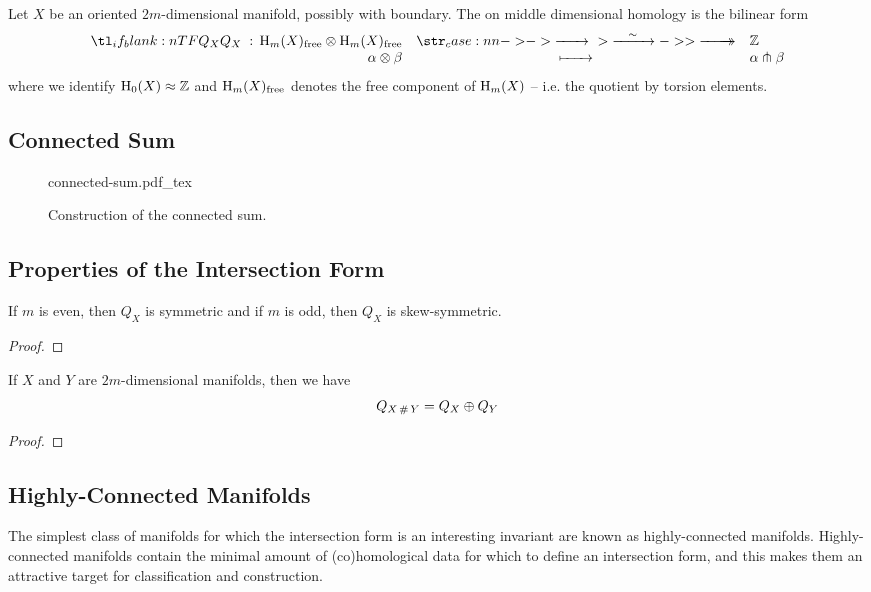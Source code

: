 \begin{definition}
	Let $X$ be an oriented $2m$-dimensional manifold, possibly with boundary. The  on middle dimensional homology is the bilinear form
	\[
		\lkxfunc{Q_X}{\H_m(X)_{\mathrm{free}}\otimes \H_m(X)_{\mathrm{free}}}{\Z}{\alpha\otimes \beta}{\alpha\tnsv \beta}
	\]
	where we identify $\operatorname{H}_0(X)\approx \mathbb{Z}$ and $\operatorname{H}_m(X)_{\mathrm{free}}$ denotes the free component of $\operatorname{H}_m(X)$ -- i.e. the quotient by torsion elements.
\end{definition}

\subsection*{Connected Sum}

\begin{figure}[ht]
	\centering
	{connected-sum.pdf_tex}
	\caption{Construction of the connected sum.}\label{fig:connected-sum}
\end{figure}

\subsection*{Properties of the Intersection Form}

\begin{proposition}\label{prop:symmetry-of-intersection-form}
	If $m$ is even, then $Q_X$ is symmetric and if $m$ is odd, then $Q_X$ is skew-symmetric.
\end{proposition}
\begin{proof}
\end{proof}

\begin{proposition}\label{prop:connected-sum-intersection-form}
	If $X$ and $Y$ are $2m$-dimensional manifolds, then we have
	\[Q_{X\,\#\,Y} = Q_X\oplus Q_Y\]
\end{proposition}
\begin{proof}
\end{proof}

\subsection*{Highly-Connected Manifolds}

The simplest class of manifolds for which the intersection form is an interesting invariant are known as highly-connected manifolds. Highly-connected manifolds contain the minimal amount of (co)homological data for which to define an intersection form, and this makes them an attractive target for classification and construction.

